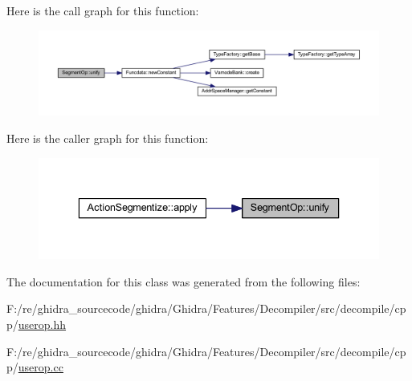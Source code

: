 Here is the call graph for this function\+:
\nopagebreak
\begin{figure}[H]
\begin{center}
\leavevmode
\includegraphics[width=350pt]{class_segment_op_acb25104d3aad5e44a3c9d5b471e39c48_cgraph}
\end{center}
\end{figure}
Here is the caller graph for this function\+:
\nopagebreak
\begin{figure}[H]
\begin{center}
\leavevmode
\includegraphics[width=336pt]{class_segment_op_acb25104d3aad5e44a3c9d5b471e39c48_icgraph}
\end{center}
\end{figure}


The documentation for this class was generated from the following files\+:\begin{DoxyCompactItemize}
\item 
F\+:/re/ghidra\+\_\+sourcecode/ghidra/\+Ghidra/\+Features/\+Decompiler/src/decompile/cpp/\mbox{\hyperlink{userop_8hh}{userop.\+hh}}\item 
F\+:/re/ghidra\+\_\+sourcecode/ghidra/\+Ghidra/\+Features/\+Decompiler/src/decompile/cpp/\mbox{\hyperlink{userop_8cc}{userop.\+cc}}\end{DoxyCompactItemize}
